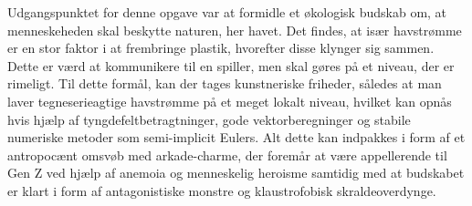 Udgangspunktet for denne opgave var at formidle et økologisk budskab om, at menneskeheden skal beskytte naturen, her havet. Det findes, at især havstrømme er en stor faktor i at frembringe plastik, hvorefter disse klynger sig sammen. Dette er værd at kommunikere til en spiller, men skal gøres på et niveau, der er rimeligt. Til dette formål, kan der tages kunstneriske friheder, således at man laver tegneserieagtige havstrømme på et meget lokalt niveau, hvilket kan opnås hvis hjælp af tyngdefeltbetragtninger, gode vektorberegninger og stabile numeriske metoder som semi-implicit Eulers. Alt dette kan indpakkes i form af et antropocænt omsvøb med arkade-charme, der foremår at være appellerende til Gen Z ved hjælp af anemoia og menneskelig heroisme samtidig med at budskabet er klart i form af antagonistiske monstre og klaustrofobisk skraldeoverdynge.

